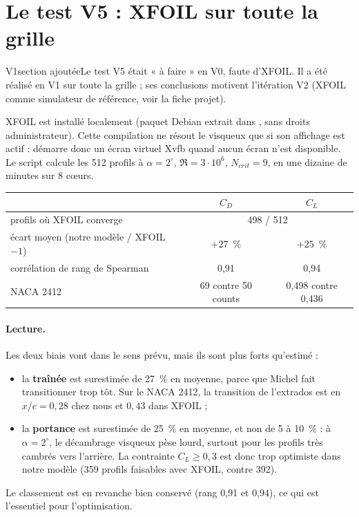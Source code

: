 \section{Le test V5 : XFOIL sur toute la grille\texorpdfstring{\ \protect{}}{ (V1)}}\label{sec:v5}
\begin{evolution}{V1}{section ajoutée}Le test V5 était « à faire » en V0, faute d'XFOIL. Il a été réalisé en V1 sur toute la grille ; ses conclusions motivent l'itération V2 (XFOIL comme simulateur de référence, voir la fiche projet).\end{evolution}
XFOIL est installé localement (paquet Debian extrait dans , sans droits administrateur). Cette compilation ne résout le visqueux que si son affichage est actif :  démarre donc un écran virtuel Xvfb quand aucun écran n'est disponible. Le script  calcule les 512 profils à $\alpha=2^\circ$, $\Re=3\cdot10^6$, $N_{crit}=9$, en une dizaine de minutes sur 8 cœurs.

\begin{center}
\begin{tabular}{lcc}
\toprule
 & $C_D$ & $C_L$ \\
\midrule
profils où XFOIL converge & \multicolumn{2}{c}{498 / 512} \\
écart moyen (notre modèle / XFOIL $-1$) & $+27$~\% & $+25$~\% \\
corrélation de rang de Spearman & 0,91 & 0,94 \\
NACA 2412 & 69 contre 50 counts & 0,498 contre 0,436 \\
\bottomrule
\end{tabular}
\end{center}

\paragraph{Lecture.} Les deux biais vont dans le sens prévu, mais ils sont plus forts qu'estimé :
\begin{itemize}
\item la \textbf{traînée} est surestimée de 27~\% en moyenne, parce que Michel fait transitionner trop tôt. Sur le NACA 2412, la transition de l'extrados est en $x/c=0{,}28$ chez nous et $0{,}43$ dans XFOIL ;
\item la \textbf{portance} est surestimée de 25~\% en moyenne, et non de 5 à 10~\% : à $\alpha=2^\circ$, le décambrage visqueux pèse lourd, surtout pour les profils très cambrés vers l'arrière. La contrainte $C_L\ge0{,}3$ est donc trop optimiste dans notre modèle (359 profils faisables avec XFOIL, contre 392).
\end{itemize}
Le classement est en revanche bien conservé (rang 0,91 et 0,94), ce qui est l'essentiel pour l'optimisation.

